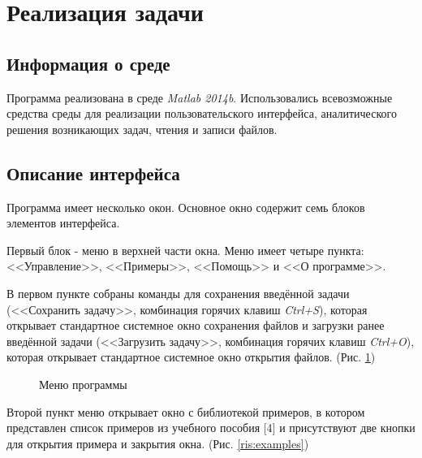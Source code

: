 \documentclass{article}
\begin{document}
\section{Реализация задачи}

\subsection{Информация о среде}

Программа реализована в среде \textit{Matlab 2014b}. Использовались всевозможные средства среды для реализации пользовательского интерфейса, аналитического решения возникающих задач, чтения и записи файлов.

\subsection{Описание интерфейса}

Программа имеет несколько окон. Основное окно содержит семь блоков элементов интерфейса.

Первый блок - меню в верхней части окна. Меню имеет четыре пункта: <<Управление>>, <<Примеры>>, <<Помощь>> и <<О программе>>. 

В первом пункте собраны команды для сохранения введённой задачи (<<Сохранить задачу>>, комбинация горячих клавиш \textit{Ctrl+S}), которая открывает стандартное системное окно сохранения файлов и загрузки ранее введённой задачи (<<Загрузить задачу>>, комбинация горячих клавиш \textit{Ctrl+O}), которая открывает стандартное системное окно открытия файлов. (Рис. \ref{ris:menu})

\begin{figure}[!h]
\caption{Меню программы}
\label{ris:menu}
\end{figure}

Второй пункт меню открывает окно с библиотекой примеров, в котором представлен список примеров из учебного пособия [4] и присутствуют две кнопки для открытия примера и закрытия окна. (Рис. \ref{ris:examples})
\end{document}
